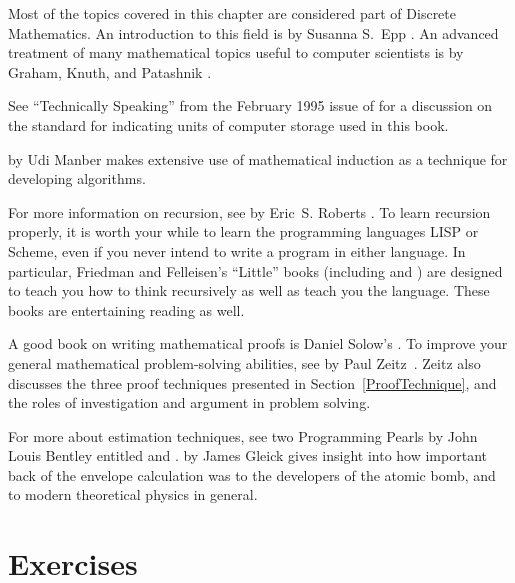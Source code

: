 Most of the topics covered in this chapter are considered part of
Discrete Mathematics.
An introduction to this field is  by Susanna S.~Epp \cite{DiscreteMath}.
An advanced treatment of many mathematical topics useful to
computer scientists is
by Graham, Knuth, and Patashnik \cite{ConcreteMath}.

See ``Technically Speaking'' from the February 1995 issue of
 \cite{IEEEStand} for a discussion on the standard
for indicating units of computer storage used in this book.

 by Udi Manber \cite{Manber} makes
extensive use of mathematical induction as a technique for developing
algorithms.

For more information on recursion, see  by
Eric~S. Roberts \cite{Roberts}.
To learn recursion properly, it is worth your while to learn the
programming languages LISP or Scheme, even if you never intend to
write a program in either language.
In particular, Friedman and Felleisen's ``Little'' books
(including \cite{LLISPer} and
\cite{Schemer})
are designed to teach you how to think recursively as
well as teach you the language.
These books are entertaining reading as well.

A good book on writing mathematical proofs is
Daniel Solow's  \cite{Solow}.
To improve your general mathematical problem-solving abilities, see
by Paul Zeitz~\cite{Zeitz}.
Zeitz also discusses the three proof techniques presented in
Section~\ref{ProofTechnique}, and the roles of investigation and
argument in problem solving.

For more about estimation techniques,
see two Programming Pearls by John Louis Bentley entitled
 and 
\cite{BentEnvOne,BentleyPearl,BentEnvTwo,BentleyMore}.
 by James Gleick
\cite{Gleick} gives insight into how important back of the envelope
calculation was to the developers of the atomic bomb, and to modern
theoretical physics in general.

\section{Exercises}

